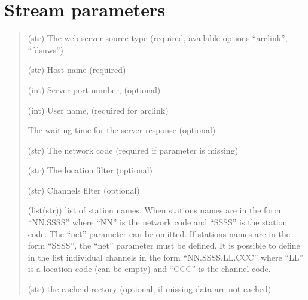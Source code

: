 \documentclass[letterpaper,10pt,english]{sphinxmanual}
\begin{document}
\section{Stream parameters}
\label{\detokenize{configuration:stream-parameters}}\begin{quote}\begin{description}
\sphinxAtStartPar
(str) The web server source type (required, available options “arclink”, “fdsnws”)

\sphinxAtStartPar
(str) Host name (required)

\sphinxAtStartPar
(int) Server port number, (optional)

\sphinxAtStartPar
(int) User name, (required for arclink)

\sphinxAtStartPar
The waiting time for the server response (optional)

\sphinxAtStartPar
(str) The network code (required if  parameter is missing)

\sphinxAtStartPar
(str) The location filter (optional)

\sphinxAtStartPar
(str) Channels filter (optional)

\sphinxAtStartPar
(list(str)) list of station names. When stations names are in the form “NN.SSSS”
where “NN” is the network code and “SSSS” is the station code.
The “net” parameter can be omitted.
If stations names are in the form “SSSS”, the “net” parameter must be defined.
It is possible to define in the list individual channels in the form “NN.SSSS.LL.CCC”
where “LL” is a location code (can be empty) and “CCC” is the channel code.

\sphinxAtStartPar
(str) the cache directory (optional, if missing data are not cached)

\end{description}\end{quote}
\end{document}
